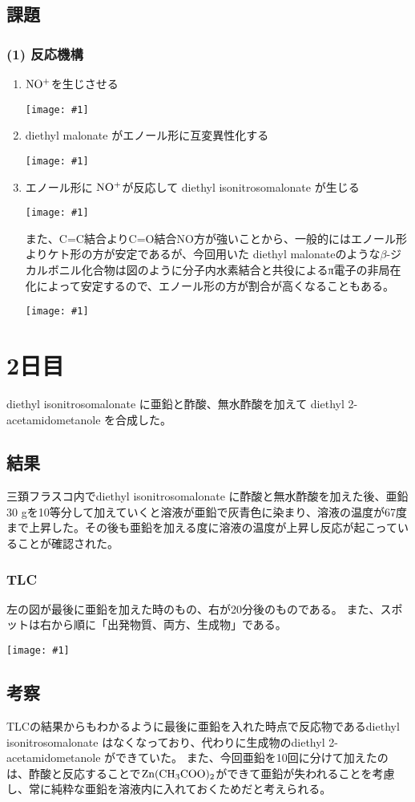 \documentclass[a4paper,papersize,dvipdfmx]{jsarticle}
\newcommand{\pict}[2]{\begin{center} \texttt{[image: \#1]} \end{center}}   %
\begin{document}
\subsection*{課題}
\subsubsection*{(1) 反応機構}

\begin{enumerate}
\item $\rm NO^+$を生じさせる
\pict{imgs1/hk1.jpeg}{10}
\item diethyl malonate がエノール形に互変異性化する
\pict{imgs1/hk2.jpeg}{12}
\item エノール形に $\rm NO^+$が反応して diethyl isonitrosomalonate が生じる
\pict{imgs1/hk3.jpeg}{12}

また、C=C結合よりC=O結合NO方が強いことから、一般的にはエノール形よりケト形の方が安定であるが、今回用いた diethyl malonateのような$\beta$-ジカルボニル化合物は図のように分子内水素結合と共役によるπ電子の非局在化によって安定するので、エノール形の方が割合が高くなることもある。
\pict{imgs1/bck.jpeg}{7}
\end{enumerate}


\section*{2日目}
diethyl isonitrosomalonate に亜鉛と酢酸、無水酢酸を加えて diethyl 2-acetamidometanole を合成した。

\subsection*{結果}
三頚フラスコ内でdiethyl isonitrosomalonate に酢酸と無水酢酸を加えた後、亜鉛30 gを10等分して加えていくと溶液が亜鉛で灰青色に染まり、溶液の温度が67度まで上昇した。その後も亜鉛を加える度に溶液の温度が上昇し反応が起こっていることが確認された。

\subsubsection*{TLC}
左の図が最後に亜鉛を加えた時のもの、右が20分後のものである。
また、スポットは右から順に「出発物質、両方、生成物」である。
\pict{imgs2/tlc.jpeg}{7.5}

\subsection*{考察}
TLCの結果からもわかるように最後に亜鉛を入れた時点で反応物であるdiethyl isonitrosomalonate はなくなっており、代わりに生成物のdiethyl 2-acetamidometanole ができていた。
また、今回亜鉛を10回に分けて加えたのは、酢酸と反応することで$\rm Zn(CH_3COO)_2$ができて亜鉛が失われることを考慮し、常に純粋な亜鉛を溶液内に入れておくためだと考えられる。
\end{document}

